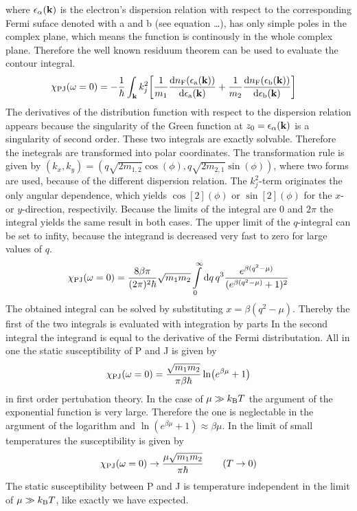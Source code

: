 %
where $\epsilon_{\alpha}(\vb{k})$  is the electron's dispersion relation with respect to the corresponding Fermi suface denoted with a and b (see equation \dots {}), has only simple poles in the complex plane, which means the function is continously in the whole complex plane.
Therefore the well known residuum theorem can be used to evaluate the contour integral.
%
\begin{align}
	\chi_{\mathrm{PJ}}(\omega = 0) &= 
		-\frac{1}{\hbar} 
		\int_{\vb{k}} 
		k_{j}^{2}
		\bigg[
			\frac{1}{m_{1}}
			\dv{n_{\mathrm{F}}(\epsilon_{\mathrm{a}}(\vb{k}))}{\epsilon_{\mathrm{a}}(\vb{k})}
			+
			\frac{1}{m_{2}}
			\dv{n_{\mathrm{F}}(\epsilon_{\mathrm{b}}(\vb{k}))}{\epsilon_{\mathrm{b}}(\vb{k})}
		\bigg]
\end{align}
%
The derivatives of the distribution function with respect to the dispersion relation appears because the singularity of the Green function at $z_{0} = \epsilon_{\alpha}(\vb{k})$ is a singularity of second order.
These two integrals are exactly solvable.
Therefore the inetegrals are transformed into polar coordinates.
The transformation rule is given by $(k_{x}, k_{y}) = (q\sqrt{2m_{1,2}}\cos(\phi), q\sqrt{2m_{2,1}}\sin(\phi))$, where two forms are used, because of the different dispersion relation.
The $k_{j}^{2}$-term originates the only angular dependence, which yields $\cos[2](\phi)$ or $\sin[2](\phi)$ for the $x$- or $y$-direction, respectivily.
Because the limits of the integral are $0$ and $2\pi$ the integral yields the same result in both cases.
The upper limit of the $q$-integral can be set to infity, because the integrand is decreased very fast to zero for large values of $q$.
%
\begin{align}
	\chi_{\mathrm{PJ}}(\omega = 0) = 
		\frac{8 \beta \pi}{(2\pi)^{2} \hbar} \sqrt{m_{1} m_{2}}
		\int\limits_{0}^{\infty} \dd{q}
		q^{3} \frac{e^{\beta(q^{2} - \mu)}}{(e^{\beta(q^{2} - \mu)} + 1)^{2}}
\end{align}
%
The obtained integral can be solved by substituting $x = \beta(q^{2} - \mu)$.
Thereby the first of the two integrals is evaluated with integration by parts
In the second integral the integrand is equal to the derivative of the Fermi distributation.
All in one the static susceptibility of P and J is given by
%
\begin{align}
	\chi_{\mathrm{PJ}}(\omega = 0) = \frac{\sqrt{m_{1} m_{2}}}{\pi \beta \hbar}\ln(e^{\beta \mu} + 1)
\end{align}
%
in first order pertubation theory. 
In the case of $\mu \gg k_{\mathrm{B}} T$ the argument of the exponential function is very large.
Therefore the one is neglectable in the argument of the logarithm and $\ln(e^{\beta\mu} + 1) \approx \beta\mu$.
In the limit of small temperatures the susceptibility is given by
%
\begin{align}
	\chi_{\mathrm{PJ}}(\omega = 0) \to \frac{\mu \sqrt{m_{1} m_{2}}}{\pi \hbar} \qquad (T \to 0)
\end{align}
%
The static susceptibility between P and J is temperature independent in the limit of $\mu \gg k_{\mathrm{B}} T$, like exactly we have expected.